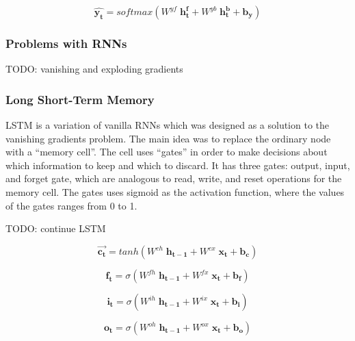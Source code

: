 \begin{equation}
\label{eq:6}
\mathbf{\widehat{y_t}} = softmax(W^{yf} \; \mathbf{h_t^f} + W^{yb} \; \mathbf{h_t^b} + \mathbf{b_y})
\end{equation}



\subsubsection{Problems with RNNs}
\label{bg:subsub4}
TODO: vanishing and exploding gradients \cite{hochreiter1991untersuchungen} \cite{hochreiter2001gradient} \cite{bengio1994learning}


\subsubsection{Long Short-Term Memory}
\label{bg:subsub5}
\ac{LSTM} \cite{hochreiter1997long} is a variation of vanilla \ac{RNNs} which was designed as a solution to the vanishing gradients problem. The main idea was to replace the ordinary node with a \enquote{memory cell}. The cell uses \enquote{gates} in order to make decisions about which information to keep and which to discard. It has three gates: output, input, and forget gate, which are analogous to read, write, and reset operations for the memory cell. The gates uses sigmoid as the activation function, where the values of the gates ranges from 0 to 1.


TODO: continue LSTM


\begin{equation}
\label{eq:10}
\mathbf{\vec{c_t}} = tanh(W^{ch} \; \mathbf{h_{t-1}} + W^{cx}\; \mathbf{x_t} + \mathbf{b_c})
\end{equation}

\begin{equation}
\label{eq:7}
\mathbf{f_t} = \sigma(W^{fh}\;\mathbf{h_{t-1}}  + W^{fx} \; \mathbf{x_t}  + \mathbf{b_f})
\end{equation}

\begin{equation}
\label{eq:8}
\mathbf{i_t } = \sigma(W^{ih} \; \mathbf{h_{t-1}} + W^{ix}\; \mathbf{x_t}  + \mathbf{b_i})
\end{equation}

\begin{equation}
\label{eq:9}
\mathbf{o_t} = \sigma(W^{oh} \; \mathbf{h_{t-1}} + W^{ox}\; \mathbf{x_t} + \mathbf{b_o})
\end{equation}

